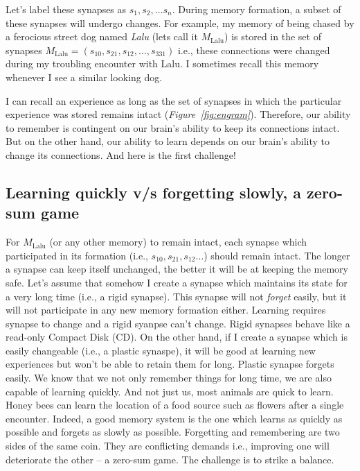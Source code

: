 \documentclass[]{resonance}
\newcommand\Fig[1]{\textit{Figure~\ref{#1}}}
\begin{document}
Let's label these synapses as $s_1, s_2, \ldots s_n$. During memory formation, a
subset of these synapses will undergo changes. For example, my memory of being
chased by a ferocious street dog named \emph{Lalu} (lets call it
$M_\text{Lalu}$) is stored in the set of synapses $M_\text{Lalu}=(s_{10},
s_{21}, s_{12},\ldots,s_{331})$ i.e., these connections were changed during my
troubling encounter with Lalu. I sometimes recall this memory whenever I see a
similar looking dog.

I can recall an experience as long as the set of synapses in which the
particular experience was stored remains intact (\Fig{fig:engram}). Therefore,
our ability to remember is contingent on our brain's ability to keep its
connections intact.  But on the other hand, our ability to learn depends on our
brain's ability to change its connections. And here is the first challenge!

\subsection{Learning quickly v/s forgetting slowly, a zero-sum game}\label{subsec:zero_sum} 

For $M_\text{Lalu}$ (or any other memory) to remain intact, each synapse which
participated in its formation (i.e., $s_{10}, s_{21}, s_{12} \ldots$) should
remain intact. The longer a synapse can keep itself unchanged, the better it
will be at keeping the memory safe. Let's assume that somehow I create a synapse
which maintains its state for a very long time (i.e., a rigid synapse). This
synapse will not \emph{forget} easily, but it will not participate in any new
memory formation either. Learning requires synapse to change and a rigid syanpse
can't change.  Rigid synapses behave like a read-only Compact Disk (CD). On the
other hand, if I create a synapse which is easily changeable (i.e., a plastic
synaspe), it will be good at learning new experiences but won't be able to
retain them for long. Plastic synapse forgets easily.  We know that we not only
remember things for long time, we are also capable of learning quickly. And not
just us, most animals are quick to learn. Honey bees can learn the location of a
food source such as flowers after a single encounter. Indeed, a good memory
system is the one which learns as quickly as possible and forgets as slowly as
possible. Forgetting and remembering are two sides of the same coin. They are
conflicting demands i.e., improving one will deteriorate the other -- a zero-sum
game. The challenge is to strike a balance. 
\end{document}
